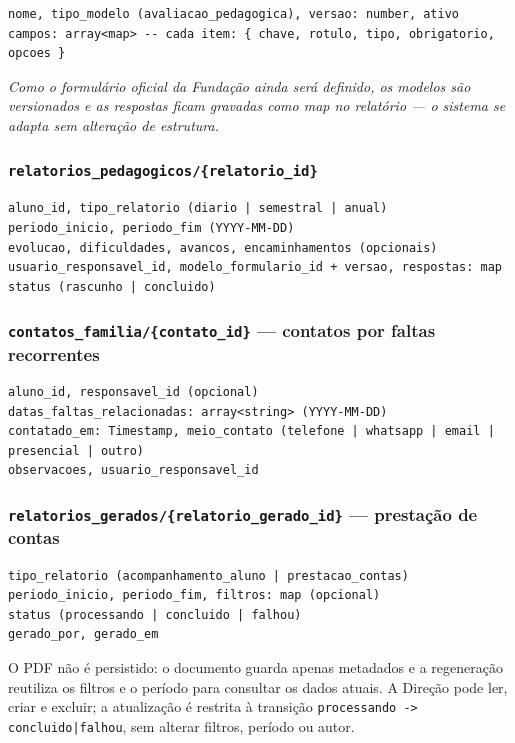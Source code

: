 \documentclass[a4paper,11pt]{article}
\begin{document}
\begin{verbatim}
nome, tipo_modelo (avaliacao_pedagogica), versao: number, ativo
campos: array<map> -- cada item: { chave, rotulo, tipo, obrigatorio, opcoes }
\end{verbatim}

\textit{Como o formulário oficial da Fundação ainda será definido, os modelos são versionados e as respostas ficam gravadas como map no relatório --- o sistema se adapta sem alteração de estrutura.}

\subsubsection*{\texttt{relatorios\_pedagogicos/\{relatorio\_id\}}}

\begin{verbatim}
aluno_id, tipo_relatorio (diario | semestral | anual)
periodo_inicio, periodo_fim (YYYY-MM-DD)
evolucao, dificuldades, avancos, encaminhamentos (opcionais)
usuario_responsavel_id, modelo_formulario_id + versao, respostas: map
status (rascunho | concluido)
\end{verbatim}

\subsubsection*{\texttt{contatos\_familia/\{contato\_id\}} --- contatos por faltas recorrentes}

\begin{verbatim}
aluno_id, responsavel_id (opcional)
datas_faltas_relacionadas: array<string> (YYYY-MM-DD)
contatado_em: Timestamp, meio_contato (telefone | whatsapp | email | presencial | outro)
observacoes, usuario_responsavel_id
\end{verbatim}

\subsubsection*{\texttt{relatorios\_gerados/\{relatorio\_gerado\_id\}} --- prestação de contas}

\begin{verbatim}
tipo_relatorio (acompanhamento_aluno | prestacao_contas)
periodo_inicio, periodo_fim, filtros: map (opcional)
status (processando | concluido | falhou)
gerado_por, gerado_em
\end{verbatim}

O PDF não é persistido: o documento guarda apenas metadados e a regeneração reutiliza os filtros e o
período para consultar os dados atuais. A Direção pode ler, criar e excluir; a atualização é restrita
à transição \texttt{processando -> concluido|falhou}, sem alterar filtros, período ou autor.
\end{document}
